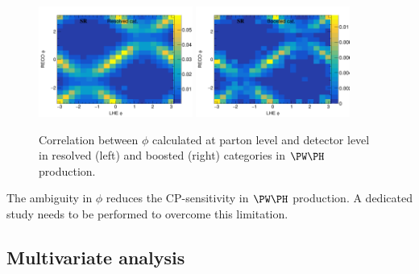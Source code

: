 \documentclass[a4paper,11pt]{article}
\begin{document}
\begin{figure}[hbtp]
\begin{center}
\includegraphics[width=0.45\textwidth]{Figures/RECO/Resolved_Plot_2D_phi_unweighted.png}
\includegraphics[width=0.45\textwidth]{Figures/RECO/Boosted_Plot_2D_phi_unweighted.png}
\end{center}
\caption{
Correlation between $\phi$ calculated at parton level and detector level in resolved (left) and boosted (right) categories in $\PW\PH$ production.
}
\label{fig:neureco}
\end{figure}

The ambiguity in $\phi$ reduces the CP-sensitivity in $\PW\PH$ production. A dedicated study needs to be performed to overcome this limitation.


\subsection{Multivariate analysis}
\end{document}
